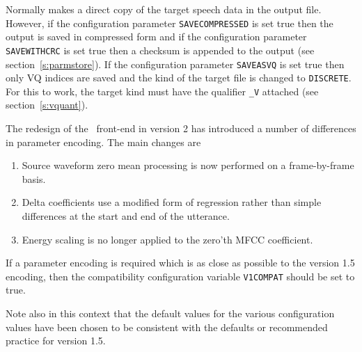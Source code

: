 Normally  makes a direct copy of the target speech data in the
output file.  However, if the configuration 
parameter \texttt{SAVECOMPRESSED}
is set true then the output is saved in compressed 
form and if the 
configuration parameter \texttt{SAVEWITHCRC}
is set true then a checksum is appended to the output 
(see section~\ref{s:parmstore}).  If the configuration 
parameter \texttt{SAVEASVQ} is set true then only
VQ indices are saved and the kind of the target file is changed to
\texttt{DISCRETE}.  For this to work, the target kind must have the
qualifier \texttt{\_V}
attached (see section~\ref{s:vquant}). 



The redesign of the \HTK\ front-end in version 2 has introduced
a number of differences in parameter encoding.  The main
changes are
\begin{enumerate}
   \item  Source waveform zero mean processing is now performed on a frame-by-frame
   basis.
   \item Delta coefficients use a modified form of regression rather than
   simple differences at the start and end of the utterance.
   \item Energy scaling is no longer applied to the zero'th MFCC coefficient.
\end{enumerate}
If a parameter encoding is required which is as close as possible
to the version 1.5 encoding, then the compatibility configuration
variable \texttt{V1COMPAT} should be set to true.

Note also in this context that the default values for the various
configuration values have been chosen to be consistent with the
defaults or recommended practice for version 1.5.


